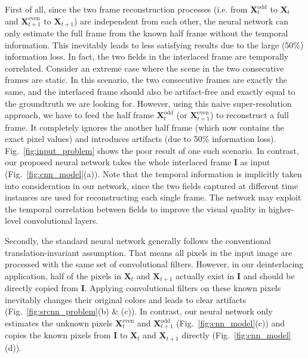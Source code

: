 \documentclass[acmtog]{acmart}
\begin{document}
First of all, since the two frame reconstruction processes (i.e. from
$\mathbf{X}^{\text{odd}}_{t}$ to $\mathbf{X}_t$ and
$\mathbf{X}^{\text{even}}_{t+1}$ to $\mathbf{X}_{t+1}$) are independent from
each other, the neural network can only estimate the full frame from the known
half frame without the temporal information. This inevitably leads to less
satisfying results due to the large (50\%) information loss. In fact, the two
fields in the interlaced frame are temporally correlated. Consider an extreme
case where the scene in the two consecutive frames are static. In this scenario,
the two consecutive frames are exactly the same, and the interlaced frame should
also be artifact-free and exactly equal to the groundtruth we are looking for.
However, using this naive super-resolution approach, we have to feed the half
frame $\mathbf{X}^{\text{odd}}_t$ (or $\mathbf{X}^{\text{even}}_{t+1}$) to
reconstruct a full frame. It completely ignores the another half frame (which
now contains the exact pixel values) and introduces artifacts (due to 50\%
information loss). Fig.~\ref{fig:input_problem} shows the  poor result of one
such scenario. In contrast, our proposed neural network takes the whole
interlaced frame $\mathbf{I}$ as input (Fig.~\ref{fig:cnn_model}(a)). Note that
the temporal information is implicitly taken into consideration in our network,
since the two fields captured at different time instances are used for reconstructing each
single frame. The network may exploit the temporal correlation between fields to
improve the visual quality in higher-level convolutional layers.

Secondly, the standard neural network generally follows the conventional
translation-invariant assumption. That means all pixels in the input image are
processed with the same set of convolutional filters. However, in our deinterlacing
application, half of the pixels in $\mathbf{X}_t$ and $\mathbf{X}_{t+1}$ actually 
exist in $\mathbf{I}$ and should be directly copied from $\mathbf{I}$. 
Applying convolutional filters on these
known pixels inevitably changes their original colors and leads to clear
artifacts (Fig.~\ref{fig:srcnn_problem}(b) \& (c)). In contrast, our neural network only
estimates the unknown pixels $\mathbf{X}^{\text{even}}_t$ and
$\mathbf{X}^{\text{odd}}_{t+1}$ (Fig.~\ref{fig:cnn_model}(c)) and copies the known
pixels from $\mathbf{I}$ to $\mathbf{X}_t$ and $\mathbf{X}_{t+1}$ directly
(Fig.~\ref{fig:cnn_model}(d)).
\end{document}
